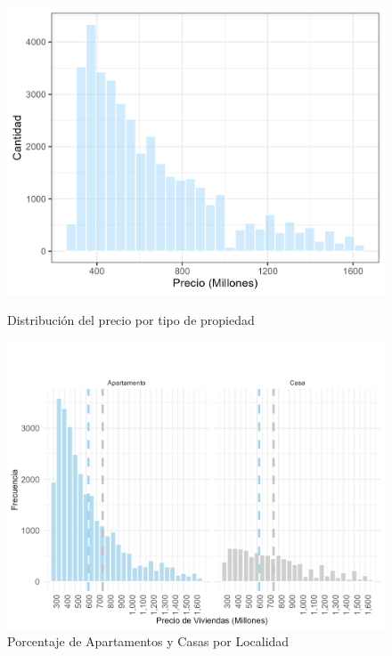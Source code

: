 \documentclass[a4paper]{article}
\theoremstyle{remark}
\theoremstyle{definition}
\begin{document}
\begin{figure}[H]
    \centering
    \begin{minipage}[t]{0.5\textwidth}
        \centering
        \includegraphics[width=\linewidth]{Graficas/Dis_precios2.png}
        \caption{Distribución del precio por tipo de propiedad}
    \end{minipage}%
    \hfill
    \begin{minipage}[t]{0.5\textwidth}
        \centering
        \includegraphics[width=\linewidth]{Graficas/Tipo_propiedad.png}
        \caption{Porcentaje de Apartamentos y Casas por Localidad}
    \end{minipage}
\end{figure}
\end{document}
